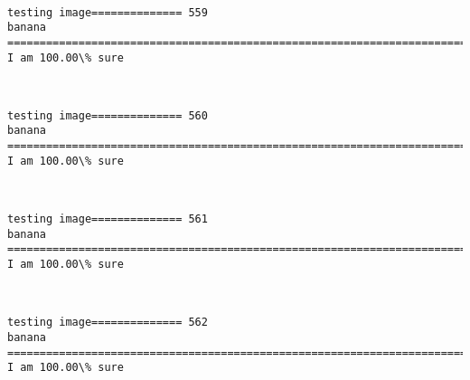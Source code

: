 \documentclass[11pt]{article}
\begin{document}
    \begin{center}
    \end{center}
    { \hspace*{\fill} \\}
    
    \begin{Verbatim}[commandchars=\\\{\}]
testing image============== 559
banana
============================================================================
I am 100.00\% sure

    \end{Verbatim}

    \begin{center}
    \end{center}
    { \hspace*{\fill} \\}
    
    \begin{Verbatim}[commandchars=\\\{\}]
testing image============== 560
banana
============================================================================
I am 100.00\% sure

    \end{Verbatim}

    \begin{center}
    \end{center}
    { \hspace*{\fill} \\}
    
    \begin{Verbatim}[commandchars=\\\{\}]
testing image============== 561
banana
============================================================================
I am 100.00\% sure

    \end{Verbatim}

    \begin{center}
    \end{center}
    { \hspace*{\fill} \\}
    
    \begin{Verbatim}[commandchars=\\\{\}]
testing image============== 562
banana
============================================================================
I am 100.00\% sure

    \end{Verbatim}
\end{document}
